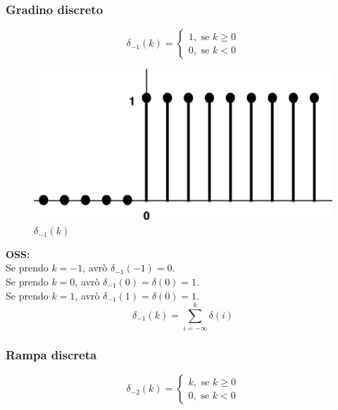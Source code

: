 \subsubsection{Gradino discreto}

	\begin{equation*}
	\delta_{-1}(k)=
	\begin{cases} 
	1, \mbox{ se } k \geq 0 \\
	0, \mbox{ se } k < 0
	\end{cases} 
	\end{equation*}

\pagebreak
	
	\begin{figure}[h]
		\centering
		\includegraphics[scale=0.5]{immagini/gradino}
		\caption{ $ \delta_{-1}(k)$ }
		\label{fig: gradino}
	\end{figure}

	\textbf{OSS:}\\
	Se prendo $ k=-1 $, avrò $ \delta_{-1}(-1) = 0 $.\\
	Se prendo $ k=0 $, avrò $ \delta_{-1}(0) = \delta(0) = 1 $.\\
	Se prendo $ k=1 $, avrò $ \delta_{-1}(1) = \delta(0) = 1 $.\\
	
	\begin{equation*}
	\delta_{-1}(k)= \sum_{i=-\infty}^{k} \delta(i)
	\end{equation*}

\subsubsection{Rampa discreta}

	\begin{equation*}
	\delta_{-2}(k)=
	\begin{cases} 
	k, \mbox{ se } k \geq 0 \\
	0, \mbox{ se } k < 0
	\end{cases} 
	\end{equation*}
	
